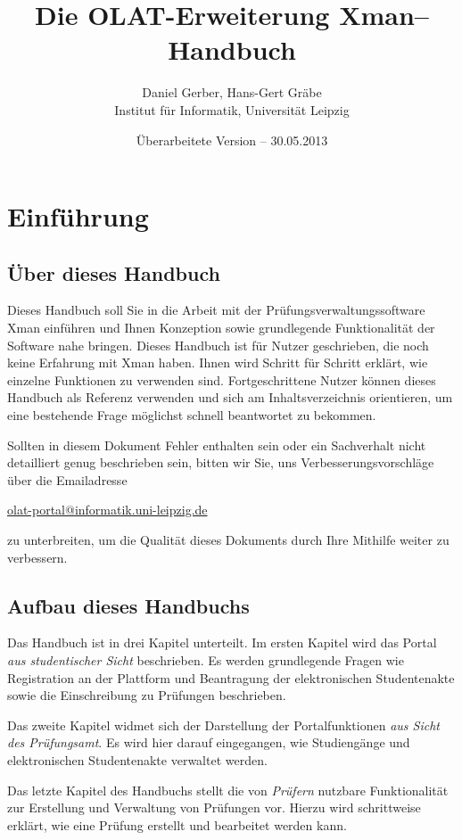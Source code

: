 \documentclass[a4paper,11pt]{article}
\author{Daniel Gerber, Hans-Gert Gräbe\\ 
Institut für Informatik, Universität Leipzig}
\title{Die OLAT-Erweiterung Xman-- Handbuch}
\date{Überarbeitete Version -- 30.05.2013}
\begin{document}
\maketitle

\tableofcontents

\clearpage
\section*{Einführung}

\subsection*{Über dieses Handbuch}

Dieses Handbuch soll Sie in die Arbeit mit der Prüfungsverwaltungssoftware
Xman einführen und Ihnen Konzeption sowie grundlegende Funktionalität der
Software nahe bringen. Dieses Handbuch ist für Nutzer geschrieben, die noch
keine Erfahrung mit Xman haben. Ihnen wird Schritt für Schritt erklärt, wie
einzelne Funktionen zu verwenden sind.  Fortgeschrittene Nutzer können dieses
Handbuch als Referenz verwenden und sich am Inhaltsverzeichnis orientieren, um
eine bestehende Frage möglichst schnell beantwortet zu bekommen.

Sollten in diesem Dokument Fehler enthalten sein oder ein Sachverhalt nicht
detailliert genug beschrieben sein, bitten wir Sie, uns
Verbesserungsvorschläge über die Emailadresse
\begin{center}
  \url{olat-portal@informatik.uni-leipzig.de} 
\end{center}
zu unterbreiten, um die Qualität dieses Dokuments durch Ihre Mithilfe weiter
zu verbessern.

\subsection*{Aufbau dieses Handbuchs}

Das Handbuch ist in drei Kapitel unterteilt. Im ersten Kapitel wird das Portal
{\em aus studentischer Sicht} beschrieben. Es werden
grundlegende Fragen wie Registration an der Plattform und Beantragung der
elektronischen Studentenakte sowie die Einschreibung zu Prüfungen beschrieben.

Das zweite Kapitel widmet sich der Darstellung der Portalfunktionen {\em aus
Sicht des Prüfungsamt}. Es wird hier darauf eingegangen,
wie Studiengänge und elektronischen Studentenakte verwaltet werden.

Das letzte Kapitel des Handbuchs stellt die von {\em Prüfern}
nutzbare Funktionalität zur Erstellung und Verwaltung von Prüfungen vor.
Hierzu wird schrittweise erklärt, wie eine Prüfung erstellt und bearbeitet
werden kann.
\end{document}
